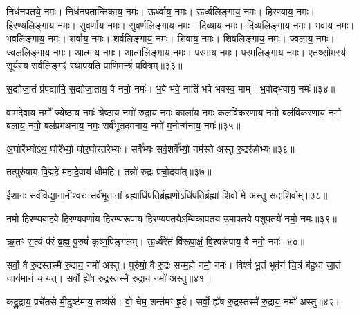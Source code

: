 \begingroup
\centering
\setmainfont[Script=Devanagari,Mapping=tex-text]{Sanskrit 2003}
\Large


\endgroup
\fontsize{19pt}{23pt}\selectfont
{}
निध॑नपतये॒ नमः।
निध॑नपतान्तिकाय॒ नमः।
ऊर्ध्वाय॒ नमः।
ऊर्ध्वलिङ्गाय॒ नमः।
हिरण्याय॒ नमः।
हिरण्यलिङ्गाय॒ नमः।
सुवर्णाय॒ नमः।
सुवर्णलिङ्गाय॒ नमः।
दिव्याय॒ नमः।
दिव्यलिङ्गाय॒ नमः।
भवाय॒ नमः।
भवलिङ्गाय॒ नमः।
शर्वाय॒ नमः।
शर्वलिङ्गाय॒ नमः।
शिवाय॒ नमः।
शिवलिङ्गाय॒ नमः।
ज्वलाय॒ नमः।
ज्वललिङ्गाय॒ नमः।
आत्माय॒ नमः।
आत्मलिङ्गाय॒ नमः।
परमाय॒ नमः।
परमलिङ्गाय॒ नमः।
एतथ्सोमस्य॑ सूर्य॒स्य॒ सर्वलिङ्गꣴ॑ स्थाप॒य॒ति॒ पाणिमन्त्रं॑ पवि॒त्रम्॥३३॥


स॒द्योजा॒तं प्र॑पद्या॒मि॒ स॒द्योजा॒ताय॒ वै नमो॒ नमः॑।
भ॒वे भ॑वे॒ नाति॑ भवे भवस्व॒ माम्।
भ॒वोद्भ॑वाय॒ नमः॑॥३४॥


वा॒म॒दे॒वाय॒ नमो᳚ ज्ये॒ष्ठाय॒ नमः॑ श्रे॒ष्ठाय॒ नमो॑ रु॒द्राय॒ नमः॒ काला॑य॒ नमः॒ कल॑विकरणाय॒ नमो॒ बल॑विकरणाय॒ नमो॒ बला॑य॒ नमो॒ बल॑प्रमथनाय॒ नमः॒ सर्व॑भूतदमनाय॒ नमो॑ म॒नोन्म॑नाय॒ नमः॑॥३५॥

अ॒घोरे᳚भ्योऽथ॒ घोरे᳚भ्यो॒ घोर॒घोर॑तरेभ्यः।
सर्वे᳚भ्यः सर्व॒शर्वे᳚भ्यो॒ नम॑स्ते अस्तु रु॒द्ररू॑पेभ्यः॥३६॥


तत्पुरु॑षाय वि॒द्महे॑ महादे॒वाय॑ धीमहि।
तन्नो॑ रुद्रः प्रचो॒दया᳚त्॥३७॥


ईशानः सर्व॑विद्या॒ना॒मीश्वरः सर्व॑भूता॒नां॒ ब्रह्माधि॑पति॒र्ब्रह्म॒णो\-ऽधि॑पति॒र्ब्रह्मा॑ शि॒वो मे॑ अस्तु सदाशि॒वोम्॥३८॥


नमो हिरण्यबाहवे हिरण्यवर्णाय हिरण्यरूपाय हिरण्यपतये\-ऽम्बिकापतय उमापतये पशुपतये॑ नमो॒ नमः॥३९॥


ऋ॒तꣳ स॒त्यं प॑रं ब्र॒ह्म॒ पु॒रुषं॑ कृष्ण॒पिङ्ग॑लम्।
ऊ॒र्ध्वरे॑तं वि॑रूपा॒क्षं॒ वि॒श्वरू॑पाय॒ वै नमो॒ नमः॑॥४०॥


सर्वो॒ वै रु॒द्रस्तस्मै॑ रु॒द्राय॒ नमो॑ अस्तु।
पुरु॑षो॒ वै रु॒द्रः सन्म॒हो नमो॒ नमः॑।
विश्वं॑ भू॒तं भुव॑नं चि॒त्रं ब॑हु॒धा जा॒तं जाय॑मानं च॒ यत्।
सर्वो॒ ह्ये॑ष रु॒द्रस्तस्मै॑ रु॒द्राय॒ नमो॑ अस्तु॥४१॥

कद्रु॒द्राय॒ प्रचे॑तसे मी॒ढुष्ट॑माय॒ तव्य॑से।
वो॒ चेम॒ शन्त॑मꣳ हृ॒दे।
सर्वो॒ ह्ये॑ष रु॒द्रस्तस्मै॑ रु॒द्राय॒ नमो॑ अस्तु॥४२॥


\setmainfont[Script=Devanagari,Mapping=tex-text]{Sanskrit 2003}
